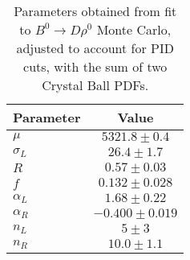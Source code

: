 \begin{table}[h]
  \centering
  \begin{tabular}{lc}
      \toprule
      Parameter & Value \\
      \midrule
      $\mu$ & $5321.8 \pm 0.4$ \\
      $\sigma_L$ & $26.4 \pm 1.7$ \\
      $R$ & $0.57 \pm 0.03$ \\
      $f$ & $0.132 \pm 0.028$ \\
      $\alpha_L$ & $1.68 \pm 0.22$ \\
      $\alpha_R$ & $-0.400 \pm 0.019$ \\
      $n_L$ & $5 \pm 3$ \\
      $n_R$ & $10.0 \pm 1.1$ \\
  \bottomrule
  \end{tabular}
  \caption{Parameters obtained from fit to $B^0 \to D\rho^0$ Monte  Carlo, adjusted to account for PID cuts, with the sum of two Crystal Ball PDFs.}
\label{tab:rho_mc_params}
\end{table}
